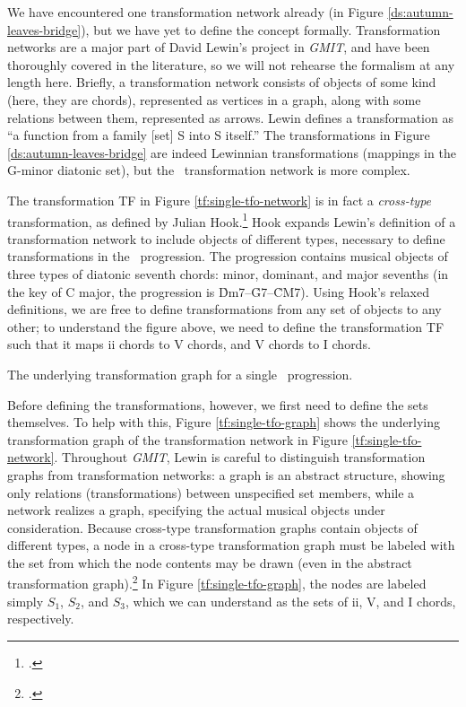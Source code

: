 \documentclass[diss]{subfiles}
\begin{document}
We have encountered one transformation network already (in Figure
\ref{ds:autumn-leaves-bridge}), but we have yet to define the concept
formally.  Transformation networks are a major part of David Lewin’s project
in \emph{GMIT}, and have been thoroughly covered in the literature, so we will
not rehearse the formalism at any length here. Briefly, a
transformation network consists of objects of some kind (here, they are
chords), represented as vertices in a graph, along with some relations between
them, represented as arrows. Lewin defines a transformation as “a function
from a family [set] S into S itself.” The transformations in Figure
\ref{ds:autumn-leaves-bridge} are indeed Lewinnian transformations (mappings
in the G-minor diatonic set), but the \tfo\ transformation network is more
complex.

The transformation TF in Figure \ref{tf:single-tfo-network} is in fact a
\emph{cross-type} transformation, as defined by Julian
Hook.\footcite{hook:2007} Hook expands Lewin’s definition of a transformation
network to include objects of different types, necessary to define
transformations in the \tfo\ progression. The progression contains musical
objects of three types of diatonic seventh chords: minor, dominant,
and major sevenths (in the key of C major, the progression is
\h{Dm7}--\h{G7}--\h{CM7}). Using Hook’s relaxed definitions, we are free to
define transformations from any set of objects to any other; to understand the
figure above, we need to define the transformation TF such that it maps
ii chords to V chords, and V chords to I
chords.

\figBeg[htbp]
  \caption{The underlying transformation graph for a single \tfo\ progression.}
  \label{tf:single-tfo-graph}
\figEnd

Before defining the transformations, however, we first need to define the sets
themselves. To help with this, Figure \ref{tf:single-tfo-graph} shows the
underlying transformation graph of the transformation network in Figure
\ref{tf:single-tfo-network}. Throughout \emph{GMIT}, Lewin is careful to
distinguish transformation graphs from transformation networks: a graph is an
abstract structure, showing only relations (transformations) between
unspecified set members, while a network realizes a graph, specifying the
actual musical objects under consideration. Because cross-type
transformation graphs contain objects of different types, a node in a
cross-type transformation graph must be labeled with the set from which the
node contents may be drawn (even in the abstract transformation
graph).\footcite[7]{hook:2007} In Figure \ref{tf:single-tfo-graph}, the nodes
are labeled simply $S_1$, $S_2$, and $S_3$, which we can understand as the
sets of ii, V, and I chords, respectively.
\end{document}
